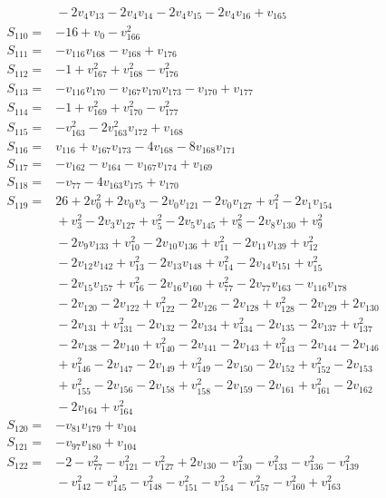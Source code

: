 \documentclass[11pt]{article}
\begin{document}
\begin{align*}
&{}-2v_{4}v_{13}-2v_{4}v_{14}-2v_{4}v_{15}-2v_{4}v_{16}+v_{165}\\
S_{110}={}&-16+v_{0}-v_{166}^{2}\\
S_{111}={}&-v_{116}v_{168}-v_{168}+v_{176}\\
S_{112}={}&-1+v_{167}^{2}+v_{168}^{2}-v_{176}^{2}\\
S_{113}={}&-v_{116}v_{170}-v_{167}v_{170}v_{173}-v_{170}+v_{177}\\
S_{114}={}&-1+v_{169}^{2}+v_{170}^{2}-v_{177}^{2}\\
S_{115}={}&-v_{163}^{2}-2v_{163}^{2}v_{172}+v_{168}\\
S_{116}={}&v_{116}+v_{167}v_{173}-4v_{168}-8v_{168}v_{171}\\
S_{117}={}&-v_{162}-v_{164}-v_{167}v_{174}+v_{169}\\
S_{118}={}&-v_{77}-4v_{163}v_{175}+v_{170}\\
S_{119}={}&26+2v_{0}^{2}+2v_{0}v_{3}-2v_{0}v_{121}-2v_{0}v_{127}+v_{1}^{2}-2v_{1}v_{154}\\
&{}+v_{3}^{2}-2v_{3}v_{127}+v_{5}^{2}-2v_{5}v_{145}+v_{8}^{2}-2v_{8}v_{130}+v_{9}^{2}\\
&{}-2v_{9}v_{133}+v_{10}^{2}-2v_{10}v_{136}+v_{11}^{2}-2v_{11}v_{139}+v_{12}^{2}\\
&{}-2v_{12}v_{142}+v_{13}^{2}-2v_{13}v_{148}+v_{14}^{2}-2v_{14}v_{151}+v_{15}^{2}\\
&{}-2v_{15}v_{157}+v_{16}^{2}-2v_{16}v_{160}+v_{77}^{2}-2v_{77}v_{163}-v_{116}v_{178}\\
&{}-2v_{120}-2v_{122}+v_{122}^{2}-2v_{126}-2v_{128}+v_{128}^{2}-2v_{129}+2v_{130}\\
&{}-2v_{131}+v_{131}^{2}-2v_{132}-2v_{134}+v_{134}^{2}-2v_{135}-2v_{137}+v_{137}^{2}\\
&{}-2v_{138}-2v_{140}+v_{140}^{2}-2v_{141}-2v_{143}+v_{143}^{2}-2v_{144}-2v_{146}\\
&{}+v_{146}^{2}-2v_{147}-2v_{149}+v_{149}^{2}-2v_{150}-2v_{152}+v_{152}^{2}-2v_{153}\\
&{}+v_{155}^{2}-2v_{156}-2v_{158}+v_{158}^{2}-2v_{159}-2v_{161}+v_{161}^{2}-2v_{162}\\
&{}-2v_{164}+v_{164}^{2}\\
S_{120}={}&-v_{81}v_{179}+v_{104}\\
S_{121}={}&-v_{97}v_{180}+v_{104}\\
S_{122}={}&-2-v_{77}^{2}-v_{121}^{2}-v_{127}^{2}+2v_{130}-v_{130}^{2}-v_{133}^{2}-v_{136}^{2}-v_{139}^{2}\\
&{}-v_{142}^{2}-v_{145}^{2}-v_{148}^{2}-v_{151}^{2}-v_{154}^{2}-v_{157}^{2}-v_{160}^{2}+v_{163}^{2}\\

\end{align*}
\end{document}
